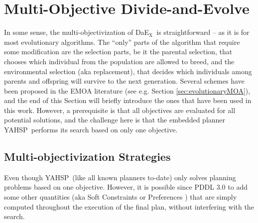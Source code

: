 \documentclass{llncs}
\def\DAEX{{\sc DaE$_{\text{X}}$}}
\def\YAHSP{{\sc YAHSP}}
\begin{document}
\section{Multi-Objective Divide-and-Evolve}
\label{modae}
In some sense, the multi-objectivization of \DAEX\ is straightforward -- as it is for most evolutionary algorithms.
The ``only'' parts of the algorithm that require some modification are the selection parts, be it the parental selection, that chooses which individual from the population are allowed to breed, and the environmental selection (aka replacement), 
that decides which individuals among parents and offspring will survive to the next generation. 
Several schemes have been proposed in the EMOA literature (see e.g. Section \ref{sec:evolutionaryMOA}), and the end of this Section will briefly introduce the ones that have been used in this work. However, a prerequisite is that all objectives are evaluated for all potential solutions, and the challenge here is that the embedded planner \YAHSP\ performs its search based on only one objective.
 
\subsection{Multi-objectivization Strategies}
\label{sec:strategies}
Even though \YAHSP\  (like all known planners to-date) only solves planning problems based on one objective. However, it is possible since PDDL 3.0 to add some other quantities (aka Soft Constraints or Preferences \cite{gerevini2006preferences}) that are simply computed throughout the execution of the final plan, without interfering with the search. 
\end{document}
